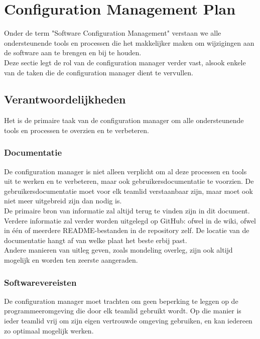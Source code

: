 
\section{Configuration Management Plan}

Onder de term "Software Configuration Management" verstaan we alle ondersteunende tools en processen die het makkelijker maken om wijzigingen aan de software aan te brengen en bij te houden. \\

Deze sectie legt de rol van de configuration manager verder vast, alsook enkele van de taken die de configuration manager dient te vervullen.

\subsection{Verantwoordelijkheden}

Het is de primaire taak van de configuration manager om alle ondersteunende tools en processen te overzien en te verbeteren.

\subsubsection{Documentatie}

De configuration manager is niet alleen verplicht om al deze processen en tools uit te werken en te verbeteren, maar ook gebruikersdocumentatie te voorzien. De gebruikersdocumentatie moet voor elk teamlid verstaanbaar zijn, maar moet ook niet meer uitgebreid zijn dan nodig is. \\

De primaire bron van informatie zal altijd terug te vinden zijn in dit document. Verdere informatie zal verder worden uitgelegd op GitHub: ofwel in de wiki, ofwel in één of meerdere README-bestanden in de repository zelf. De locatie van de documentatie hangt af van welke plaat het beste erbij past. \\

Andere manieren van uitleg geven, zoals mondeling overleg, zijn ook altijd mogelijk en worden ten zeerste aangeraden.

\subsubsection{Softwarevereisten}

De configuration manager moet trachten om geen beperking te leggen op de programmeeromgeving die door elk teamlid gebruikt wordt. Op die manier is ieder teamlid vrij om zijn eigen vertrouwde omgeving gebruiken, en kan iedereen zo optimaal mogelijk werken. \\

